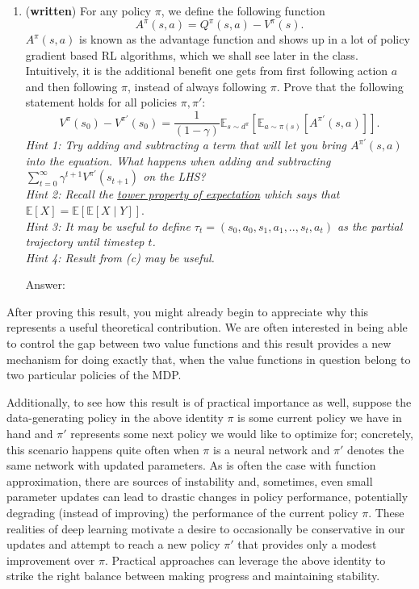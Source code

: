 \documentclass{article}
\begin{document}
 \begin{enumerate}
    
    \item [(d) (5 pts)] (\textbf{written}) For any policy $\pi$, we define the following function $$A^\pi(s,a) = Q^\pi(s,a) - V^\pi(s).$$ $A^\pi(s,a)$ is known as the advantage function and shows up in a lot of policy gradient based RL algorithms, which we shall see later in the class. Intuitively, it is the additional benefit one gets from first following action $a$ and then following $\pi$, instead of always following $\pi$. Prove that the following statement holds for all policies $\pi,\pi'$: $$V^\pi(s_0) - V^{\pi'}(s_0) = \frac{1}{(1-\gamma)} \mathbb{E}_{s \sim d^\pi}\left[\mathbb{E}_{a \sim \pi(s)}\left[A^{\pi'}(s,a)\right]\right].$$
    \emph{Hint 1: Try adding and subtracting a term that will let you bring $A^{\pi'}(s,a)$ into the equation. What happens when adding and subtracting $\sum\limits_{t=0}^\infty \gamma^{t+1} V^{\pi'}(s_{t+1})$ on the LHS?} \\
    \emph{Hint 2: Recall the \href{https://en.wikipedia.org/wiki/Law_of_total_expectation}{tower property of expectation} which says that $\mathbb{E}\left[X\right] = \mathbb{E}\left[\mathbb{E}\left[X \mid Y\right]\right]$}. \\
    \emph{Hint 3: It may be useful to define $\tau_t = (s_0, a_0, s_1, a_1, .., s_t, a_t)$ as the partial trajectory until timestep $t$. }\\
     \emph{Hint 4: Result from (c) may be useful.}
\begin{tcolorbox}[breakable]
Answer: 
\end{tcolorbox}
\clearpage
\end{enumerate}

After proving this result, you might already begin to appreciate why this represents a useful theoretical contribution. We are often interested in being able to control the gap between two value functions and this result provides a new mechanism for doing exactly that, when the value functions in question belong to two particular policies of the MDP. 

Additionally, to see how this result is of practical importance as well, suppose the data-generating policy in the above identity $\pi$ is some current policy we have in hand and $\pi'$ represents some next policy we would like to optimize for; concretely, this scenario happens quite often when $\pi$ is a neural network and $\pi'$ denotes the same network with updated parameters. As is often the case with function approximation, there are sources of instability and, sometimes, even small parameter updates can lead to drastic changes in policy performance, potentially degrading (instead of improving) the performance of the current policy $\pi$. These realities of deep learning motivate a desire to occasionally be conservative in our updates and attempt to reach a new policy $\pi'$ that provides only a modest improvement over $\pi$. Practical approaches can leverage the above identity to strike the right balance between making progress and maintaining stability. 
\end{document}

